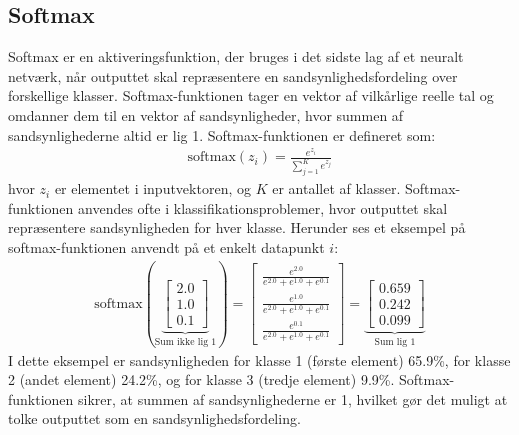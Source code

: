 \documentclass{article}
\begin{document}
\subsection{Softmax}
Softmax er en aktiveringsfunktion, der bruges i det sidste lag af et neuralt netværk, når outputtet skal repræsentere en sandsynlighedsfordeling over forskellige klasser. Softmax-funktionen tager en vektor af vilkårlige reelle tal og omdanner dem til en vektor af sandsynligheder, hvor summen af sandsynlighederne altid er lig 1. Softmax-funktionen er defineret som:
\begin{align}
  \text{softmax}(z_i) = \frac{e^{z_i}}{\sum_{j=1}^{K} e^{z_j}}
\end{align}
hvor $z_i$ er elementet i inputvektoren, og $K$ er antallet af klasser. \parencite{kurbiel2021softmax} Softmax-funktionen anvendes ofte i klassifikationsproblemer, hvor outputtet skal repræsentere sandsynligheden for hver klasse. Herunder ses et eksempel på softmax-funktionen anvendt på et enkelt datapunkt $i$:
\begin{align}
  \text{softmax}\left(\underbrace{\begin{bmatrix}
    2.0 \\
    1.0 \\
    0.1
  \end{bmatrix}}_{\text{Sum ikke lig 1}}\right)
  = \begin{bmatrix}
    \frac{e^{2.0}}{e^{2.0} + e^{1.0} + e^{0.1}} \\
    \frac{e^{1.0}}{e^{2.0} + e^{1.0} + e^{0.1}} \\
    \frac{e^{0.1}}{e^{2.0} + e^{1.0} + e^{0.1}}
  \end{bmatrix}
  = \underbrace{\begin{bmatrix}
    0.659 \\
    0.242 \\
    0.099
  \end{bmatrix}}_{\text{Sum lig 1}}
\end{align}
I dette eksempel er sandsynligheden for klasse 1 (første element) 65.9\%, for klasse 2 (andet element) 24.2\%, og for klasse 3 (tredje element) 9.9\%. Softmax-funktionen sikrer, at summen af sandsynlighederne er 1, hvilket gør det muligt at tolke outputtet som en sandsynlighedsfordeling. \parencite{Sanderson_2017}
\end{document}
